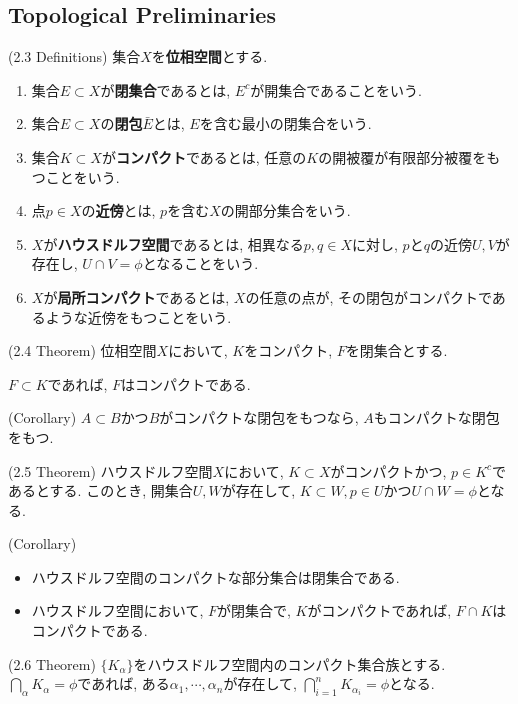 \documentclass[a4paper]{jsarticle}
\begin{document}
\subsection{Topological Preliminaries}
\begin{defi}{(2.3 Definitions)}{}
    集合$X$を{\bf 位相空間}とする.
    \begin{enumerate}
        \item 集合$E\subset X$が{\bf 閉集合}であるとは, $E^c$が開集合であることをいう.
        \item 集合$E\subset X$の{\bf 閉包$\bar{E}$}とは, $E$を含む最小の閉集合をいう. 
        \item 集合$K\subset X$が{\bf コンパクト}であるとは, 任意の$K$の開被覆が有限部分被覆をもつことをいう.
        \item 点$p\in X$の{\bf 近傍}とは, $p$を含む$X$の開部分集合をいう.
        \item $X$が{\bf ハウスドルフ空間}であるとは, 相異なる$p, q\in X$に対し, $p$と$q$の近傍$U, V$が存在し, $U\cap V=\phi$となることをいう.
        \item $X$が{\bf 局所コンパクト}であるとは, $X$の任意の点が, その閉包がコンパクトであるような近傍をもつことをいう.
    \end{enumerate}
\end{defi}
\begin{thm}{(2.4 Theorem)}{}
    位相空間$X$において, $K$をコンパクト, $F$を閉集合とする.

    $F\subset K$であれば, $F$はコンパクトである.
\end{thm}
\begin{cor}{(Corollary)}{}
    $A\subset B$かつ$B$がコンパクトな閉包をもつなら, $A$もコンパクトな閉包をもつ.
\end{cor}
\begin{thm}{(2.5 Theorem)}{}
    ハウスドルフ空間$X$において, $K\subset X$がコンパクトかつ, $p\in K^c$であるとする. このとき, 開集合$U, W$が存在して, $K\subset W, p\in U$かつ$U\cap W=\phi$となる.
\end{thm}
\begin{cor}{(Corollary)}{}
    \begin{itemize}
        \item ハウスドルフ空間のコンパクトな部分集合は閉集合である.
        \item ハウスドルフ空間において, $F$が閉集合で, $K$がコンパクトであれば, $F\cap K$はコンパクトである.
    \end{itemize}
\end{cor}
\begin{thm}{(2.6 Theorem)}{}
    $\{ K_\alpha\}$をハウスドルフ空間内のコンパクト集合族とする. $\bigcap_\alpha K_\alpha=\phi$であれば, ある$\alpha_1, \cdots, \alpha_n$が存在して, $\bigcap_{i=1}^n K_{\alpha_i}=\phi$となる.
\end{thm}
\end{document}
